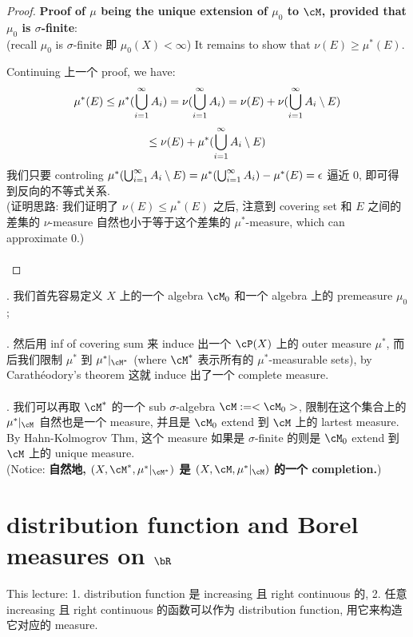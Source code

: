 \documentclass[lang=cn,11pt]{elegantbook}
\begin{document}
\begin{proof}
\noindent \textbf{Proof of $\mu$ being the unique extension of $\mu_0$ to $\cM$, provided that $\mu_0$ is $\sigma$-finite}:\\
\noindent (recall $\mu_0$ is $\sigma$-finite 即 $\mu_0(X) < \infty$) It remains to show that $\nu(E) \geq \mu^*(E)$.

\noindent Continuing 上一个 proof, we have:
$$
\mu^*(E) \leq \mu^*(\bigcup_{i=1}^\infty A_i) = \nu(\bigcup_{i=1}^\infty A_i) = \nu(E) + \nu(\bigcup_{i=1}^\infty A_i \setminus E)
$$
$$
\leq \nu(E) + \mu^*(\bigcup_{i=1}^\infty A_i \setminus E)
$$
我们只要 controling $\mu^*(\bigcup_{i=1}^\infty A_i \setminus E) = \mu^*(\bigcup_{i=1}^\infty A_i ) - \mu^*(E) = \epsilon $ 逼近 0, 即可得到反向的不等式关系.\\
\noindent (证明思路: 我们证明了 $\nu(E) \leq \mu^*(E)$ 之后, 注意到 covering set 和 $E$ 之间的差集的 $\nu$-measure 自然也小于等于这个差集的 $\mu^*$-measure, which can approximate 0.)
\\\\

\end{proof}


\begin{remark}
. 我们首先容易定义 $X$ 上的一个 algebra $\cM_0$ 和一个 algebra 上的 premeasure $\mu_0$; \\\\
    . 然后用 inf of covering sum 来 induce 出一个 $\cP(X)$ 上的 outer measure $\mu^*$, 而后我们限制 $\mu^*$ 到 $\mu^*|_{\cM^*}$ (where $\cM^*$ 表示所有的 $\mu^*$-measurable sets), by Carathéodory's theorem 这就 induce 出了一个 complete measure. \\\\
    . 我们可以再取 $\cM^*$ 的一个 sub $\sigma$-algebra $\cM := <\cM_0>$, 限制在这个集合上的 $\mu^*|_{\cM}$ 自然也是一个 measure, 并且是 $\cM_0$ extend 到 $\cM$ 上的 lartest measure. By Hahn-Kolmogrov Thm, 这个 measure 如果是 $\sigma$-finite 的则是 $\cM_0$ extend 到 $\cM$ 上的 unique measure.\\
    \noindent (Notice: \textbf{自然地, $(X, \cM^*, \mu^* |_{\cM^*})$ 是 $(X, \cM, \mu^*|_{\cM})$ 的一个 completion.})
    
\end{remark}








\chapter{distribution function and Borel measures on $\bR$}
This lecture: 
1. distribution function 是 increasing 且 right continuous 的, 
2. 任意 increasing 且 right continuous 的函数可以作为 distribution function, 用它来构造它对应的 measure.
\end{document}
